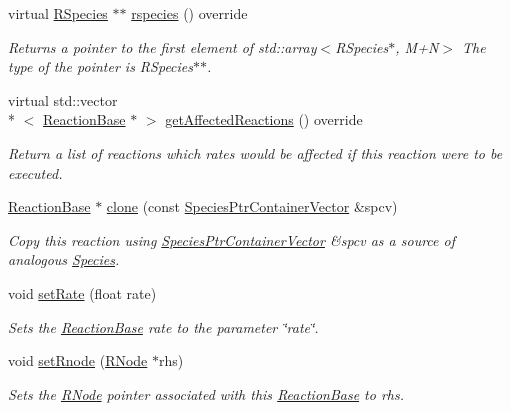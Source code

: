 \begin{DoxyCompactItemize}
virtual \hyperlink{classchem_1_1RSpecies}{R\-Species} $\ast$$\ast$ \hyperlink{classchem_1_1Reaction_a541ddbcb6988934f4fba5e16f7520bec}{rspecies} () override
\begin{DoxyCompactList}\small\item\em Returns a pointer to the first element of std\-::array$<$R\-Species$\ast$, M+\-N$>$ The type of the pointer is R\-Species$\ast$$\ast$. \end{DoxyCompactList}\item 
virtual std\-::vector\\*
$<$ \hyperlink{classchem_1_1ReactionBase}{Reaction\-Base} $\ast$ $>$ \hyperlink{classchem_1_1Reaction_a01859a22b800334a2702426ff501ec30}{get\-Affected\-Reactions} () override
\begin{DoxyCompactList}\small\item\em Return a list of reactions which rates would be affected if this reaction were to be executed. \end{DoxyCompactList}\item 
\hyperlink{classchem_1_1ReactionBase}{Reaction\-Base} $\ast$ \hyperlink{classchem_1_1ReactionBase_a6d8e6fe06e073991fe263393ec418867}{clone} (const \hyperlink{classchem_1_1SpeciesPtrContainerVector}{Species\-Ptr\-Container\-Vector} \&spcv)
\begin{DoxyCompactList}\small\item\em Copy this reaction using \hyperlink{classchem_1_1SpeciesPtrContainerVector}{Species\-Ptr\-Container\-Vector} \&spcv as a source of analogous \hyperlink{classchem_1_1Species}{Species}. \end{DoxyCompactList}\item 
void \hyperlink{classchem_1_1ReactionBase_a5ed952d7a8e2db636d51dd8252e73f5e}{set\-Rate} (float rate)
\begin{DoxyCompactList}\small\item\em Sets the \hyperlink{classchem_1_1ReactionBase}{Reaction\-Base} rate to the parameter \char`\"{}rate\char`\"{}. \end{DoxyCompactList}\item 
void \hyperlink{classchem_1_1ReactionBase_ab77397a30302fbbd5eade2b79f6d4ca4}{set\-Rnode} (\hyperlink{classchem_1_1RNode}{R\-Node} $\ast$rhs)
\begin{DoxyCompactList}\small\item\em Sets the \hyperlink{classchem_1_1RNode}{R\-Node} pointer associated with this \hyperlink{classchem_1_1ReactionBase}{Reaction\-Base} to rhs. \end{DoxyCompactList}\item 
$$
\end{DoxyCompactItemize}
